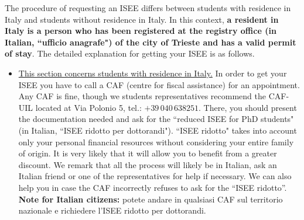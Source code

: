 \documentclass{sissavademecum}
\begin{document}
The procedure of requesting an ISEE differs between students with residence in Italy and students without residence in Italy. In this context, \textbf{a resident in Italy is a person who has been registered at the registry office (in Italian, ``ufficio anagrafe") of the city of Trieste and has a valid permit of stay}. The detailed explanation for getting your ISEE is as follows.
\begin{itemize}
    \item \underline{This section concerns students with residence in Italy.}
    In order to get your ISEE you have to call a CAF (centre for fiscal assistance) for an appointment. Any CAF is fine, though we students representatives recommend the CAF-UIL located at Via Polonio 5, tel.: $+39 \, 040 \, 638251$. There, you should present the documentation needed and ask for the ``reduced ISEE for PhD students" (in Italian, ``ISEE ridotto per dottorandi"). ``ISEE ridotto" takes into account only your personal financial resources without considering your entire family of origin. It is very likely that it will allow you to benefit from a greater discount. We remark that all the process will likely be in Italian, ask an Italian friend or one of the representatives for help if necessary. We can also help you in case the CAF incorrectly refuses to ask for the ``ISEE ridotto''. \\
    \textbf{Note for Italian citizens:} potete andare in qualsiasi CAF sul territorio nazionale e richiedere l'ISEE ridotto per dottorandi.
    

\end{itemize}
\end{document}
